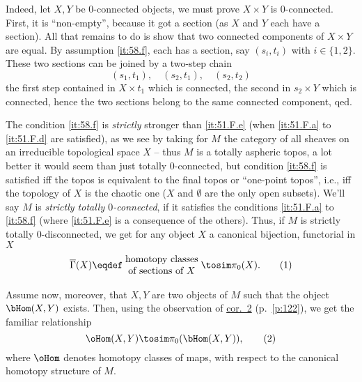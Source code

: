 Indeed, let $X,Y$ be $0$-connected objects, we must prove $X\times Y$
is $0$-connected. First, it is ``non-empty'', because it got a section
(as $X$ and $Y$ each have a section). All that remains to do is show
that two connected components of $X\times Y$ are equal. By assumption
\ref{it:58.f}, each has a section, say $(s_i,t_i)$ with
$i\in\{1,2\}$. These two sections can be joined by a two-step chain
\[ (s_1,t_1), \quad (s_2,t_1), \quad (s_2,t_2)\]
the first step contained in $X\times t_1$ which is connected, the
second in $s_2\times Y$ which is connected, hence the two sections
belong to the same connected component, qed.

The condition \ref{it:58.f} is \emph{strictly} stronger than
\ref{it:51.F.e} (when \ref{it:51.F.a} to \ref{it:51.F.d} are
satisfied), as we see by taking for $M$ the category of all sheaves on
an irreducible topological space $X$ -- thus $M$ is a totally aspheric
topos, a lot better it would seem than just totally $0$-connected, but
condition \ref{it:58.f} is satisfied if{f} the topos is equivalent to
the final topos or ``one-point topos'', i.e., if{f} the topology of
$X$ is the chaotic one ($X$ and $\emptyset$ are the only open
subsets). We'll say $M$ is \emph{strictly totally $0$-connected}, if
it satisfies the conditions \ref{it:51.F.a} to \ref{it:58.f} (where
\ref{it:51.F.e} is a consequence of the others). Thus, if $M$ is
strictly totally $0$-disconnected, we get for any object $X$ a
canonical bijection, functorial in $X$
\begin{equation}
  \label{eq:58.1}
  \overline\Gamma(X) \eqdef \;\begin{tabular}{@{}c@{}}homotopy classes\\of sections of
  $X$\end{tabular}\; \tosim \pi_0(X).
  \tag{1}
\end{equation}

Assume now, moreover, that $X,Y$ are two objects of $M$ such that the
object $\bHom(X,Y)$ exists. Then, using the observation of
\hyperref[cor:51.E.2]{cor.\ 2} (p.\ \ref{p:122}), we get
the familiar relationship
\begin{equation}
  \label{eq:58.2}
  \oHom(X,Y) \tosim \pi_0(\bHom(X,Y)),
  \tag{2}
\end{equation}
where $\oHom$ denotes homotopy classes of maps, with respect to the
canonical homotopy structure of $M$.

